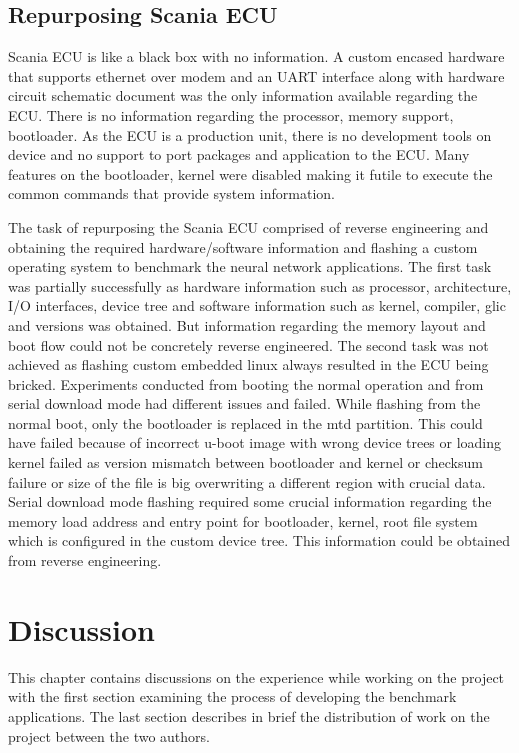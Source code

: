 \section{Repurposing Scania ECU}
Scania ECU is like a black box with no information. A custom encased hardware that supports ethernet over modem and an UART interface along with hardware circuit schematic document was the only information available regarding the ECU. There is no information regarding the processor,  memory support, bootloader. As the ECU is a production unit, there is no development tools on device and no support to port packages and application to the ECU. Many features on the bootloader, kernel were disabled making it futile to execute the common commands that provide system information.

The task of repurposing the Scania ECU comprised of reverse engineering and obtaining the required hardware/software information and flashing a custom operating system to benchmark the neural network applications. The first task was partially successfully as hardware information such as processor, architecture, I/O interfaces, device tree and software information such as kernel, compiler, glic and versions was obtained. But information regarding the memory layout and boot flow could not be concretely reverse engineered. The second task was not achieved as flashing custom embedded linux always resulted in the ECU being bricked. Experiments conducted from booting the normal operation and from serial download mode had different issues and failed. While flashing from the normal boot, only the bootloader is replaced in the mtd partition. This could have failed because of incorrect u-boot image with wrong device trees or loading kernel failed as version mismatch between bootloader and kernel or checksum failure or size of the file is big overwriting a different region with crucial data. Serial download mode flashing required some crucial information regarding the memory load address and entry point for bootloader, kernel, root file system which is configured in the custom device tree. This information could be obtained from reverse engineering.


\chapter{Discussion}

This chapter contains discussions on the experience while working on the project with the first section examining the process of developing the benchmark applications. The last section describes in brief the distribution of work on the project between the two authors.

